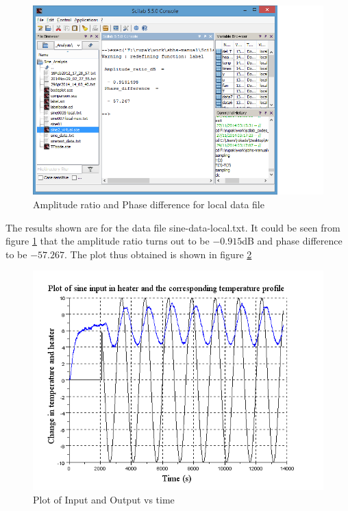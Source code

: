   
\begin{figure}
\includegraphics[width=\linewidth]{sinetest_manual/sine-local-analysis-console.png}
\caption{Amplitude ratio and Phase difference for local data file}
\label{scilab_op}
\end{figure}
The results shown are for the data file {sine-data-local.txt}. It could be seen from figure \ref{scilab_op} that the amplitude ratio turns out to be $-0.915$dB and phase difference to be $-57.267$\textdegree.
The plot thus obtained is shown in figure \ref{plot0.4}
\begin{figure}
\includegraphics[width=\linewidth]{sinetest_manual/sine-local-analysis}
\caption{Plot of Input and Output vs time}
\label{plot0.4}
\end{figure}

